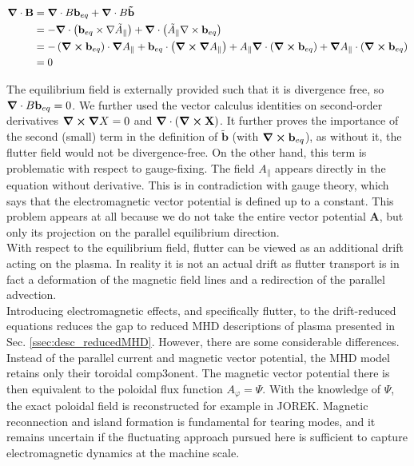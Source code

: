 \begin{align}
	\grad\cdot\mathbf{B} &= \grad\cdot B\mathbf{b}_{eq} + \grad\cdot B\mathbf{\tilde{b}} \nonumber \\
	&= -\grad\cdot \left(\mathbf{b}_{eq} \times \nabla \tilde{A}_\parallel\right) + \grad\cdot \left(\tilde{A}_\parallel \nabla \times \mathbf{b}_{eq}\right) \nonumber \\
	&= -\left(\grad\cross\mathbf{b}_{eq}\right)\cdot\grad A_\parallel + \mathbf{b}_{eq}\cdot\left(\grad\cross\grad A_\parallel\right) + A_\parallel\grad\cdot\left(\grad\cross\mathbf{b}_{eq}\right) + \grad A_\parallel\cdot\left(\grad\cross\mathbf{b}_{eq}\right) \nonumber \\
	&= 0
\end{align}

The equilibrium field is externally provided such that it is divergence free, so $\grad\cdot B\mathbf{b}_{eq} = 0$. We further used the vector calculus identities on second-order derivatives $\grad\cross\grad X = 0$ and $\grad\cdot\left(\grad\cross\mathbf{X}\right)$. It further proves the importance of the second (small) term in the definition of $\mathbf{\tilde{b}}$ (with $\grad\cross\mathbf{b}_{eq}$), as without it, the flutter field would not be divergence-free. On the other hand, this term is problematic with respect to gauge-fixing. The field $A_\parallel$ appears directly in the equation without derivative. This is in contradiction with gauge theory, which says that the electromagnetic vector potential is defined up to a constant. This problem appears at all because we do not take the entire vector potential $\textbf{A}$, but only its projection on the parallel equilibrium direction. \\
 
With respect to the equilibrium field, flutter can be viewed as an additional drift acting on the plasma. In reality it is not an actual drift as flutter transport is in fact a deformation of the magnetic field lines and a redirection of the parallel advection. \\

Introducing electromagnetic effects, and specifically flutter, to the drift-reduced equations reduces the gap to reduced MHD descriptions of plasma presented in Sec. \ref{ssec:desc_reducedMHD}. However, there are some considerable differences. Instead of the parallel current and magnetic vector potential, the MHD model retains only their toroidal comp3onent. The magnetic vector potential there is then equivalent to the poloidal flux function $A_\varphi = \Psi$. With the knowledge of $\Psi$, the exact poloidal field is reconstructed for example in JOREK\cite{hoelzl2021jorek}. Magnetic reconnection and island formation is fundamental for tearing modes, and it remains uncertain if the fluctuating approach pursued here is sufficient to capture electromagnetic dynamics at the machine scale.  \\

